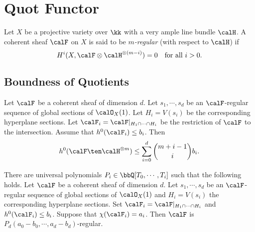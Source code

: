 \section{Quot Functor}



    \begin{definition}\label{def:m-regular_of_coherent_sheaves}
        Let \(X\) be a projective variety over \(\kk\) with a very ample line bundle \(\calH\).
        A coherent sheaf \(\calF\) on \(X\) is said to be \emph{\(m\)-regular} (with respect to \(\calH\)) if
        \[H^i(X, \calF\otimes \calH^{\otimes (m-i)}) = 0 \quad \text{for all } i > 0.\]
    \end{definition}

\subsection{Boundness of Quotients}

    \begin{lemma}\label{lem}
        Let \(\calF\) be a coherent sheaf of dimension \(d\). 
        Let \(s_1,\cdots,s_d\) be an \(\calF\)-regular sequence of global sections of \(\calO_X(1)\).
        Let \(H_i = V(s_i)\) be the corresponding hyperplane sections.
        Let \(\calF_i = \calF|_{H_1\cap \cdots \cap H_i}\) be the restriction of \(\calF\) to the intersection.
        Assume that \(h^0(\calF_i)\leq b_i\).
        Then 
        \[ h^0(\calF \ten \calH^{\otimes m}) \leq \sum_{i=0}^d \binom{m+i-1}{i} b_i. \]
    \end{lemma}

    \begin{proposition}
        There are universal polynomials \(P_i \in \bbQ[T_0,\cdots,T_i]\) such that the following holds.
        Let \(\calF\) be a coherent sheaf of dimension \(d\).
        Let \(s_1,\cdots,s_d\) be an \(\calF\)-regular sequence of global sections of \(\calO_X(1)\) and \(H_i = V(s_i)\) the corresponding hyperplane sections.
        Set \(\calF_i = \calF|_{H_1\cap \cdots \cap H_i}\) and \(h^0(\calF_i) \leq b_i\).
        Suppose that \(\chi(\calF_i) = a_i\).
        Then \(\calF\) is \(P_d(a_0-b_0,\cdots,a_d-b_d)\)-regular.
    \end{proposition}

